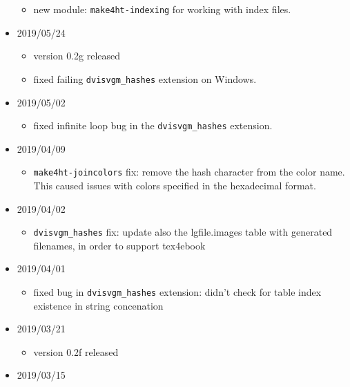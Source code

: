 \begin{itemize}
  \begin{itemize}
  \tightlist
  \item
    new module: \texttt{make4ht-indexing} for working with index files.
  \end{itemize}
\item
  2019/05/24

  \begin{itemize}
  \tightlist
  \item
    version 0.2g released
  \item
    fixed failing \texttt{dvisvgm\_hashes} extension on Windows.
  \end{itemize}
\item
  2019/05/02

  \begin{itemize}
  \tightlist
  \item
    fixed infinite loop bug in the \texttt{dvisvgm\_hashes} extension.
  \end{itemize}
\item
  2019/04/09

  \begin{itemize}
  \tightlist
  \item
    \texttt{make4ht-joincolors} fix: remove the hash character from the
    color name. This caused issues with colors specified in the
    hexadecimal format.
  \end{itemize}
\item
  2019/04/02

  \begin{itemize}
  \tightlist
  \item
    \texttt{dvisvgm\_hashes} fix: update also the lgfile.images table
    with generated filenames, in order to support tex4ebook
  \end{itemize}
\item
  2019/04/01

  \begin{itemize}
  \tightlist
  \item
    fixed bug in \texttt{dvisvgm\_hashes} extension: didn't check for
    table index existence in string concenation
  \end{itemize}
\item
  2019/03/21

  \begin{itemize}
  \tightlist
  \item
    version 0.2f released
  \end{itemize}
\item
  2019/03/15


\end{itemize}
